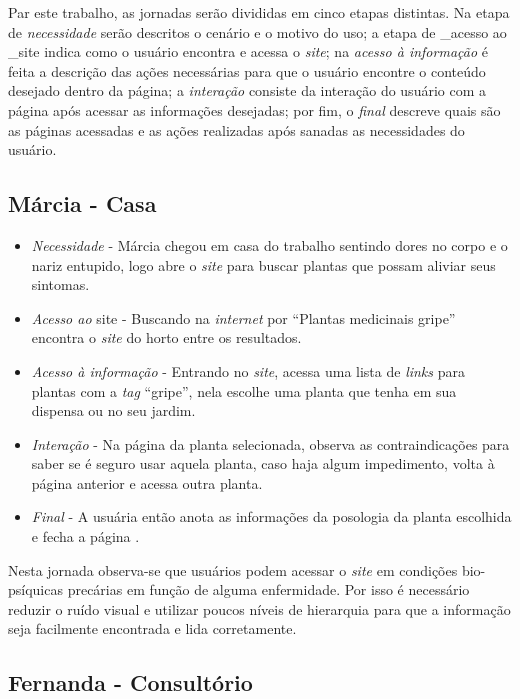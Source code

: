 Par este trabalho, as jornadas serão divididas em cinco etapas distintas. Na etapa de \emph{necessidade} serão descritos o cenário e o motivo do uso; a etapa de \_acesso ao \_site indica como o usuário encontra e acessa o \emph{site}; na \emph{acesso à informação} é feita a descrição das ações necessárias para que o usuário encontre o conteúdo desejado dentro da página; a \emph{interação} consiste da interação do usuário com a página após acessar as informações desejadas; por fim, o \emph{final} descreve quais são as páginas acessadas e as ações realizadas após sanadas as necessidades do usuário.

\subsection{Márcia - Casa}\label{marcia---casa}

\begin{itemize}
\item
  \emph{Necessidade} - Márcia chegou em casa do trabalho sentindo dores no corpo e o nariz entupido, logo abre o \emph{site} para buscar plantas que possam aliviar seus sintomas.
\item
  \emph{Acesso ao} site - Buscando na \emph{internet} por ``Plantas medicinais gripe'' encontra o \emph{site} do horto entre os resultados.
\item
  \emph{Acesso à informação} - Entrando no \emph{site}, acessa uma lista de \emph{links} para plantas com a \emph{tag} ``gripe'', nela escolhe uma planta que tenha em sua dispensa ou no seu jardim.
\item
  \emph{Interação} - Na página da planta selecionada, observa as contraindicações para saber se é seguro usar aquela planta, caso haja algum impedimento, volta à página anterior e acessa outra planta.
\item
  \emph{Final} - A usuária então anota as informações da posologia da planta escolhida e fecha a página .
\end{itemize}

Nesta jornada observa-se que usuários podem acessar o \emph{site} em condições bio-psíquicas precárias em função de alguma enfermidade. Por isso é necessário reduzir o ruído visual e utilizar poucos níveis de hierarquia para que a informação seja facilmente encontrada e lida corretamente.

\subsection{Fernanda - Consultório}\label{fernanda---consultorio}

